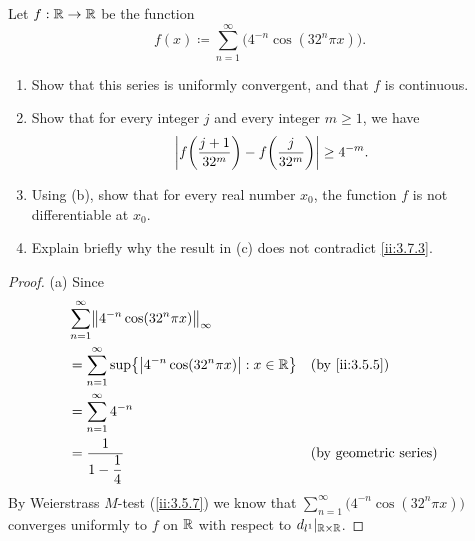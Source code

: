 \begin{ex}\label{ii:ex:4.7.10}
  Let \(f : \mathbb{R} \to \mathbb{R}\) be the function
  \[
    f(x) \coloneqq \sum_{n = 1}^\infty \big(4^{-n} \cos(32^n \pi x)\big).
  \]
  \begin{enumerate}
    \item Show that this series is uniformly convergent, and that \(f\) is continuous.
    \item Show that for every integer \(j\) and every integer \(m \geq 1\), we have
          \[
            \left\lvert f\bigg(\dfrac{j + 1}{32^m}\bigg) - f\bigg(\dfrac{j}{32^m}\bigg)\right\rvert \geq 4^{-m}.
          \]
    \item Using (b), show that for every real number \(x_0\), the function \(f\) is not differentiable at \(x_0\).
    \item Explain briefly why the result in (c) does not contradict \cref{ii:3.7.3}.
  \end{enumerate}
\end{ex}

\begin{proof}{(a)}
  Since
  \begin{align*}
     & \sum_{n = 1}^\infty \norm*{4^{-n} \cos(32^n \pi x)}_{\infty}                                               \\
     & = \sum_{n = 1}^\infty \sup\set{\abs{4^{-n} \cos(32^n \pi x)} : x \in \R} &  & \by{ii:3.5.5}                \\
     & = \sum_{n = 1}^\infty 4^{-n}                                                                               \\
     & = \dfrac{1}{1 - \dfrac{1}{4}}                                            &  & \text{(by geometric series)}
  \end{align*}
  By Weierstrass \(M\)-test (\cref{ii:3.5.7}) we know that \(\sum_{n = 1}^\infty \big(4^{-n} \cos(32^n \pi x)\big)\) converges uniformly to \(f\) on \(\mathbb{R}\) with respect to \(d_{l^1}|_{\mathbb{R} \times \mathbb{R}}\).
\end{proof}

